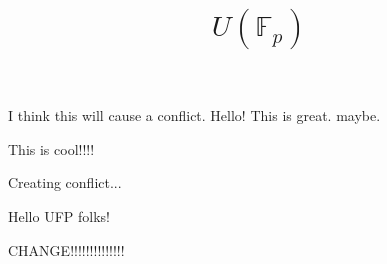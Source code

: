 \documentclass{amsart}
\begin{document}
I think this will cause a conflict. 
 Hello! This is great. maybe. 

This is cool!!!!

    \title{$U(\mathbb{F}_p)$}

Creating conflict...

    \maketitle

 Hello UFP folks!

CHANGE!!!!!!!!!!!!!!
\end{document}

